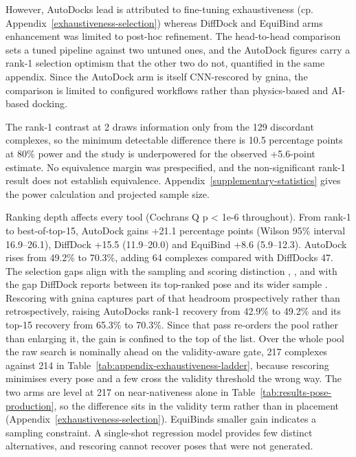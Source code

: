 However, AutoDock\textquotesingle{}s lead is attributed to fine-tuning exhaustiveness (cp. Appendix~\ref{exhaustiveness-selection}) whereas DiffDock and EquiBind arms enhancement was limited to post-hoc refinement. The head-to-head comparison sets a tuned pipeline against two untuned ones, and the AutoDock figures carry a rank-1 selection optimism that the other two do not, quantified in the same appendix. Since the AutoDock arm is itself CNN-rescored by gnina, the comparison is limited to configured workflows rather than physics-based and AI-based docking.

The rank-1 contrast at 2\angstrom{} draws information only from the 129 discordant complexes, so the minimum detectable difference there is 10.5 percentage points at 80\% power and the study is underpowered for the observed +5.6-point estimate. No equivalence margin was prespecified, and the non-significant rank-1 result does not establish equivalence. Appendix~\ref{supplementary-statistics} gives the power calculation and projected sample size.

Ranking depth affects every tool (Cochran\textquotesingle s Q p \textless{} 1e-6 throughout). From rank-1 to best-of-top-15, AutoDock gains +21.1 percentage points (Wilson 95\% interval 16.9--26.1), DiffDock +15.5 (11.9--20.0) and EquiBind +8.6 (5.9--12.3). AutoDock rises from 49.2\% to 70.3\%, adding 64 complexes compared with DiffDock\textquotesingle s 47. The selection gaps align with the sampling and scoring distinction \cite{ref003}, \cite{ref050}, \cite{ref052} and with the gap DiffDock reports between its top-ranked pose and its wider sample \cite{ref024}. Rescoring with gnina captures part of that headroom prospectively rather than retrospectively, raising AutoDock\textquotesingle s rank-1 recovery from 42.9\% to 49.2\% and its top-15 recovery from 65.3\% to 70.3\%. Since that pass re-orders the pool rather than enlarging it, the gain is confined to the top of the list. Over the whole pool the raw search is nominally ahead on the validity-aware gate, 217 complexes against 214 in Table~\ref{tab:appendix-exhaustiveness-ladder}, because rescoring minimises every pose and a few cross the validity threshold the wrong way. The two arms are level at 217 on near-nativeness alone in Table~\ref{tab:results-pose-production}, so the difference sits in the validity term rather than in placement (Appendix~\ref{exhaustiveness-selection}). EquiBind\textquotesingle s smaller gain indicates a sampling constraint. A single-shot regression model provides few distinct alternatives, and rescoring cannot recover poses that were not generated.

